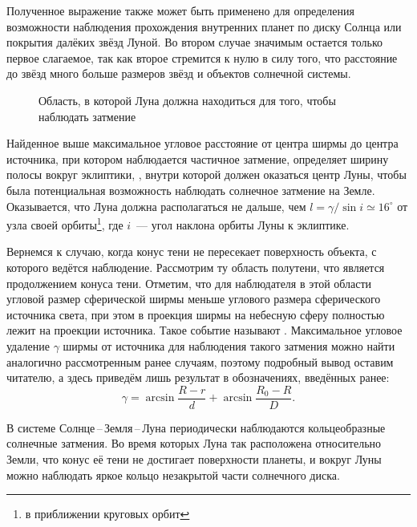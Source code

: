 Полученное выражение также может быть применено для определения возможности наблюдения прохождения внутренних планет по диску Солнца или покрытия далёких звёзд Луной. Во втором случае значимым остается только первое слагаемое, так как второе стремится к нулю в силу того, что расстояние до звёзд много больше размеров звёзд и объектов солнечной системы.

\begin{wrapfigure}[9]{r}{0.37\tw}
    \centering
    \vspace{-1pc}
    
    \caption{Область, в которой Луна должна находиться для того, чтобы наблюдать затмение}
    \label{pic:elipses-node-distance}    
\end{wrapfigure}
Найденное выше максимальное угловое расстояние от центра ширмы до центра источника, при котором наблюдается частичное затмение, определяет ширину полосы вокруг эклиптики, , внутри которой должен оказаться центр Луны, чтобы была потенциальная возможность наблюдать солнечное затмение на Земле. Оказывается, что Луна должна располагаться не дальше, чем $l = \gamma / \sin i \simeq 16^\circ$ от узла своей орбиты\footnote{в приближении круговых орбит}, где $i$~--- угол наклона орбиты Луны к эклиптике. 

Вернемся к случаю, когда конус тени не пересекает поверхность объекта, с которого ведётся наблюдение. Рассмотрим ту область полутени, что является продолжением конуса тени. Отметим, что для наблюдателя в этой области угловой размер сферической ширмы меньше углового размера сферического источника света, при этом в проекция ширмы на небесную сферу полностью лежит на проекции источника. Такое событие называют . Максимальное угловое удаление $\gamma$ ширмы от источника для наблюдения такого затмения можно найти аналогично рассмотренным ранее случаям, поэтому подробный вывод оставим читателю, а здесь приведём лишь результат в обозначениях, введённых ранее:
\begin{equation*}
    \gamma = \arcsin \frac{R - r}{d} + \arcsin \frac{R_0 - R}{D}.
\end{equation*}

В системе Солнце\,--\,Земля\,--\,Луна периодически наблюдаются кольцеобразные солнечные затмения. Во время которых Луна так расположена относительно Земли, что конус её тени не достигает поверхности планеты, и вокруг Луны можно наблюдать яркое кольцо незакрытой части солнечного диска. 

